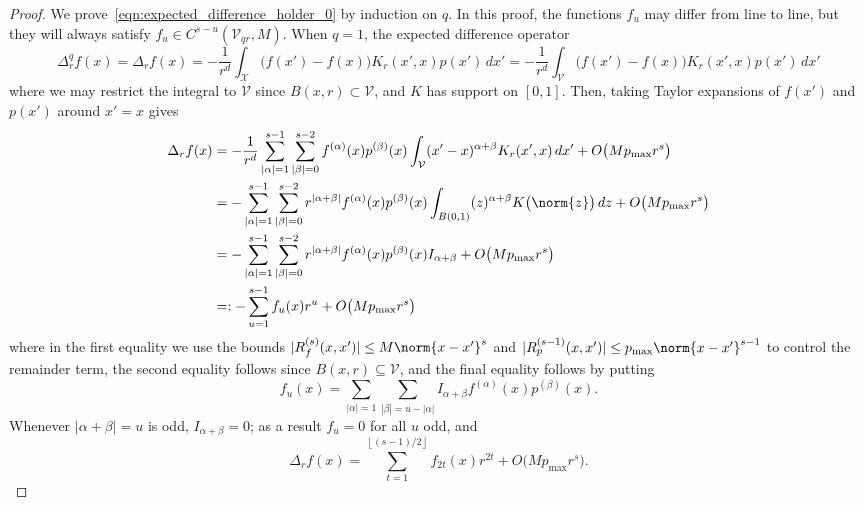 \documentclass{article}
\newcommand{\abs}[1]{\left \lvert #1 \right \rvert}
\newcommand{\floor}[1]{\left\lfloor #1 \right\rfloor}
\newcommand{\1}{\mathbf{1}}
\newcommand{\Xset}{\mathcal{X}}
\newcommand{\Vset}{\mathcal{V}}
\theoremstyle{alden}
\theoremstyle{aldenthm}
\theoremstyle{definition}
\theoremstyle{remark}
\begin{document}
\begin{proof}
	We prove~\eqref{eqn:expected_difference_holder_0} by induction on $q$. In this proof, the functions $f_u$ may differ from line to line, but they will always satisfy $f_u \in C^{s - u}(\Vset_{qr},M)$. When $q = 1$, the expected difference operator
	\begin{equation*}
	\Delta_r^qf(x) = \Delta_rf(x) = -\frac{1}{r^d}\int_{\Xset} \bigl(f(x') - f(x)\bigr) K_r(x',x) p(x') \,dx' =  -\frac{1}{r^d}\int_{\Vset} \bigl(f(x') - f(x)\bigr) K_r(x',x) p(x') \,dx' 
	\end{equation*}
	where we may restrict the integral to $\Vset$ since $B(x,r) \subset \Vset$, and $K$ has support on $[0,1]$. Then, taking Taylor expansions of $f(x')$ and $p(x')$ around $x' = x$ gives
	\begin{equation}
	\begin{aligned}
	\label{eqn:expected_difference_holder_1}
	\Delta_rf(x) & = -\frac{1}{r^d} \sum_{\abs{\alpha} = 1}^{s - 1} \sum_{\abs{\beta} = 0}^{s - 2}  f^{(\alpha)}(x) p^{(\beta)}(x) \int_{\Vset} (x' - x)^{\alpha + \beta} K_r(x',x) \,dx' + O\bigl(M p_{\max}r^s\bigr) \\
	& = -\sum_{\abs{\alpha} = 1}^{s - 1} \sum_{\abs{\beta} = 0}^{s - 2}  r^{\abs{\alpha + \beta}} f^{(\alpha)}(x) p^{(\beta)}(x) \int_{B(0,1)} (z)^{\alpha + \beta} K\bigl(\norm{z}\bigr) \,dz + O\bigl(M p_{\max}r^s\bigr) \\
	& = -\sum_{\abs{\alpha} = 1}^{s - 1} \sum_{\abs{\beta} = 0}^{s - 2}  r^{\abs{\alpha + \beta}} f^{(\alpha)}(x) p^{(\beta)}(x) I_{\alpha + \beta} + O\bigl(M p_{\max}r^s\bigr) \\
	& =: -\sum_{u = 1}^{s - 1} f_u(x) r^u + O\bigl(M p_{\max}r^s\bigr)
	\end{aligned}
	\end{equation}
	where in the first equality we use the bounds $|R_f^{(s)}(x,x')| \leq M\norm{x - x'}^s$ and $|R_p^{(s - 1)}(x,x')| \leq p_{\max}\norm{x - x'}^{s - 1}$ to control the remainder term, the second equality follows since $B(x,r) \subseteq \Vset$, and the final equality follows by putting
	\begin{equation}
	\label{eqn:expected_difference_holder_2}
	f_u(x) = \sum_{\abs{\alpha} = 1} \sum_{\abs{\beta} = u - \abs{\alpha}} I_{\alpha + \beta} f^{(\alpha)}(x) p^{(\beta)}(x).
	\end{equation}
	Whenever $\abs{\alpha + \beta} = u$ is odd, $I_{\alpha + \beta} = 0$; as a result $f_u = 0$ for all $u$ odd, and
	\begin{equation*}
	\Delta_rf(x) = \sum_{t = 1}^{\floor{(s - 1)/2}} f_{2t}(x)r^{2t} + O\bigl(Mp_{\max}r^s\bigr).

\end{equation*}
\end{proof}
\end{document}
